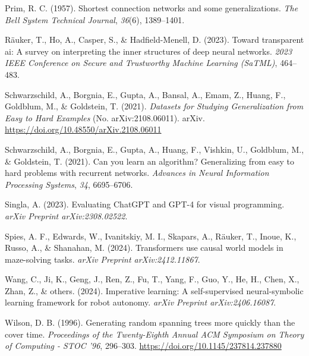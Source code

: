 \documentclass[10pt,a4paper,onecolumn]{article}
\newlength{\cslhangindent}
\newenvironment{CSLReferences}[2] %
 {\begin{list}{}{%
  \setlength{\itemindent}{0pt}
  \setlength{\leftmargin}{0pt}
  \setlength{\parsep}{0pt}
  \ifodd #1
   \setlength{\leftmargin}{\cslhangindent}
   \setlength{\itemindent}{-1\cslhangindent}
  \fi
  \setlength{\itemsep}{#2\baselineskip}}}
 {\end{list}}
\begin{document}
\begin{CSLReferences}{1}{0.5}
\leavevmode{}%
Prim, R. C. (1957). Shortest connection networks and some
generalizations. \emph{The Bell System Technical Journal}, \emph{36}(6),
1389--1401.

\leavevmode{}%
Räuker, T., Ho, A., Casper, S., \& Hadfield-Menell, D. (2023). Toward
transparent ai: A survey on interpreting the inner structures of deep
neural networks. \emph{2023 IEEE Conference on Secure and Trustworthy
Machine Learning (SaTML)}, 464--483.

\leavevmode{}%
Schwarzschild, A., Borgnia, E., Gupta, A., Bansal, A., Emam, Z., Huang,
F., Goldblum, M., \& Goldstein, T. (2021). \emph{Datasets for {Studying
Generalization} from {Easy} to {Hard Examples}} (No. arXiv:2108.06011).
{arXiv}. \url{https://doi.org/10.48550/arXiv.2108.06011}

\leavevmode{}%
Schwarzschild, A., Borgnia, E., Gupta, A., Huang, F., Vishkin, U.,
Goldblum, M., \& Goldstein, T. (2021). Can you learn an algorithm?
Generalizing from easy to hard problems with recurrent networks.
\emph{Advances in Neural Information Processing Systems}, \emph{34},
6695--6706.

\leavevmode{}%
Singla, A. (2023). Evaluating ChatGPT and GPT-4 for visual programming.
\emph{arXiv Preprint arXiv:2308.02522}.

\leavevmode{}%
Spies, A. F., Edwards, W., Ivanitskiy, M. I., Skapars, A., Räuker, T.,
Inoue, K., Russo, A., \& Shanahan, M. (2024). Transformers use causal
world models in maze-solving tasks. \emph{arXiv Preprint
arXiv:2412.11867}.

\leavevmode{}%
Wang, C., Ji, K., Geng, J., Ren, Z., Fu, T., Yang, F., Guo, Y., He, H.,
Chen, X., Zhan, Z., \& others. (2024). Imperative learning: A
self-supervised neural-symbolic learning framework for robot autonomy.
\emph{arXiv Preprint arXiv:2406.16087}.

\leavevmode{}%
Wilson, D. B. (1996). Generating random spanning trees more quickly than
the cover time. \emph{Proceedings of the Twenty-Eighth Annual {ACM}
Symposium on {Theory} of Computing - {STOC} '96}, 296--303.
\url{https://doi.org/10.1145/237814.237880}

\end{CSLReferences}
\end{document}
